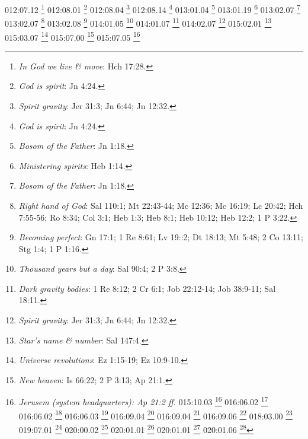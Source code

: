 {{{{{{{{{{{{{{{{{{012:07.12 \footnote{\textit{In God we live & move}: Hch 17:28.}
012:08.01 \footnote{\textit{God is spirit}: Jn 4:24.}
012:08.04 \footnote{\textit{Spirit gravity}: Jer 31:3; Jn 6:44; Jn 12:32.}
012:08.14 \footnote{\textit{God is spirit}: Jn 4:24.}
013:01.04 \footnote{\textit{Bosom of the Father}: Jn 1:18.}
013:01.19 \footnote{\textit{Ministering spirits}: Heb 1:14.}
013:02.07 \footnote{\textit{Bosom of the Father}: Jn 1:18.}
013:02.07 \footnote{\textit{Right hand of God}: Sal 110:1; Mt 22:43-44; Mc 12:36; Mc 16:19; Lc 20:42; Hch 7:55-56; Ro 8:34; Col 3:1; Heb 1:3; Heb 8:1; Heb 10:12; Heb 12:2; 1 P 3:22.}
013:02.08 \footnote{\textit{Becoming perfect}: Gn 17:1; 1 Re 8:61; Lv 19::2; Dt 18:13; Mt 5:48; 2 Co 13:11; Stg 1:4; 1 P 1:16.}
014:01.05 \footnote{\textit{Thousand years but a day}: Sal 90:4; 2 P 3:8.}
014:01.07 \footnote{\textit{Dark gravity bodies}: 1 Re 8:12; 2 Cr 6:1; Job 22:12-14; Job 38:9-11; Sal 18:11.}
014:02.07 \footnote{\textit{Spirit gravity}: Jer 31:3; Jn 6:44; Jn 12:32.}
015:02.01 \footnote{\textit{Star's name & number}: Sal 147:4.}
015:03.07 \footnote{\textit{Universe revolutions}: Ez 1:15-19; Ez 10:9-10.}
015:07.00 \footnote{\textit{New heaven}: Is 66:22; 2 P 3:13; Ap 21:1.}
015:07.05 \footnote{\textit{Jerusem (system headquarters): Ap 21:2 ff.}
015:10.03 \footnote{\textit{Ancients of Days}: Dn 7:9,13,22.}
016:06.02 \footnote{\textit{Adjutant mind spirits}: Ap 5:6.}
016:06.02 \footnote{\textit{Mind of Jesus}: Sal 2:5; 1 Co 2:16.}
016:06.03 \footnote{\textit{Kindred minds}: Ro 12:15; Ro 15:5-6; 1 Co 1:10; 1 Co 13:11; Flp 1:27; Flp 2:2; Flp 4:2; 1 P 3:8; 1 P 4:1.}
016:09.04 \footnote{\textit{God's spirit lives in us (T/A)}: Job 32:8,18; Is 63:10-11; Ez 37:14; Mt 10:20; Lc 17:21; Jn 17:21-23; Ro 8:9-11; 1 Co 3:16-17; 1 Co 6:19; 2 Co 6:16; Gl 2:20; 1 Jn 3:24; 1 Jn 4:12-15; Ap 21:3.}
016:09.04 \footnote{\textit{Self known as it knows}: 1 Co 13:12.}
016:09.06 \footnote{\textit{Jesus revealed God to man}: Mt 5:45-48; Mt 6:1,4,6; Mt 11:25-27; Mc 11:25-26; Lc 6:35-36; Lc 10:22; Jn 1:18; Jn 3:31-34; Jn 4:21-24; Jn 6:45-46; Jn 10:36-38; Jn 14:6-11,20; Jn 15:15; Jn 16:25; Jn 17:8,25-26.}
018:03.00 \footnote{\textit{Ancients of Days}: Dn 7:9,13,22.}
019:07.01 \footnote{\textit{Paradise}: Lc 23:43; 2 Co 12:4; Ap 2:7.}
020:00.02 \footnote{\textit{Descending Sons}: Jn 1:1-2.}
020:01.01 \footnote{\textit{Divine origin}: Jn 1:1-2.}
020:01.01 \footnote{\textit{Paradise Sons of God}: Jn 1:1-2; Flp 2:5-7.}
020:01.06 \footnote{\textit{Son poured out spirit on flesh}: Ez 11:19; Ez 18:31; Ez 36:26-27; Jl 2:28-29; Lc 24:49; Jn 7:39; Jn 14:16-18,23,26; Jn 15:4,26; Jn 16:7-8,13-14; Jn 17:21-23; Hch 1:5,8a; Hch 2:1-4,17-18; Hch 2:33; 2 Co 13:5; Gl 2:20; Gl 4:6; Ef 1:13; Ef 4:30; 1 Jn 4:12-15.}
}}}}}}}}}}}}}}}}}}}
